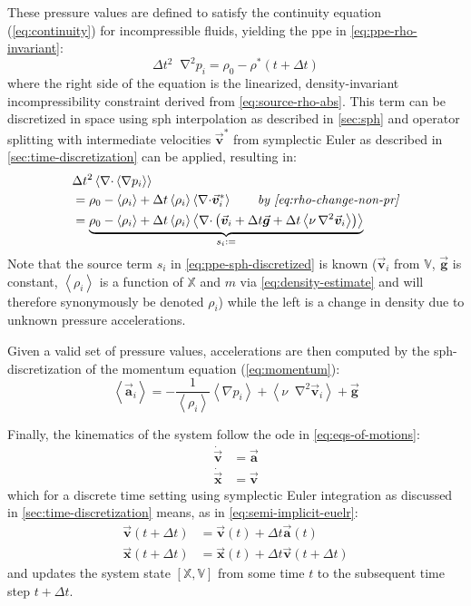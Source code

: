 \documentclass[conference]{IEEEtran}
\newcommand*\Laplace{\mathop{}\!\mathbin\nabla^2}
\newcommand\vek[1]{\vec{\bm{#1}}}
\newcommand\mat[1]{{\mathds{#1}}}
\newcommand\br[1]{\left(#1\right)}
\newcommand\abr[1]{\left\langle#1\right\rangle}
\newcommand\divergence{{\nabla\cdot}}
\begin{document}
These pressure values are defined to satisfy the continuity equation (\autoref{eq:continuity}) for incompressible fluids, yielding the \acf{ppe} in \autoref{eq:ppe-rho-invariant}:
\begin{equation}
  \Delta t^2 \Laplace p_i = \rho_0 - \rho^*(t+\Delta t)
\end{equation}
where the right side of the equation is the linearized, density-invariant incompressibility constraint derived from \autoref{eq:source-rho-abs}. This term can be discretized in space using \ac{sph} interpolation as described in \autoref{sec:sph} and operator splitting with intermediate velocities $\vek{v}^*$ from symplectic Euler as described in \autoref{sec:time-discretization} can be applied, resulting in:
\begin{align}
  &\Delta t^2 \abr{\divergence \abr{\nabla p_i}} \\
  &= \rho_0 - \abr{\rho_i} + \Delta t \abr{\rho_i}\abr{\divergence \vek{v}^*_i}\qquad\textit{by \autoref{eq:rho-change-non-pr}}\\
  &= \underbrace{\rho_0 - \abr{\rho_i} + \Delta t \abr{\rho_i}\abr{\divergence \br{\vek{v}_i + \Delta t \vek{g} + \Delta t \abr{\nu\Laplace\vek{v}_i}}}}_{s_i :=}  %
  \label{eq:ppe-sph-discretized}
\end{align}
Note that the source term $s_i$ in \autoref{eq:ppe-sph-discretized} is known ($\vek{v}_i$ from $\mat{V}$, $\vek{g}$ is constant, $\abr{\rho_i}$ is a function of $\mat{X}$ and $m$ via \autoref{eq:density-estimate} and will therefore synonymously be denoted $\rho_i$) while the left is a change in density due to unknown pressure accelerations.

Given a valid set of pressure values, accelerations are then computed by the \ac{sph}-discretization of the momentum equation (\autoref{eq:momentum}):
\begin{equation}\label{eq:discretized-momentum}
  \abr{\vek{a}_i }= -\frac{1}{\abr{\rho_i}}\abr{\nabla p_i} + \abr{ \nu \Laplace \vek{v}_i} + \vek{g}
\end{equation}

Finally, the kinematics of the system follow the \acs{ode} in \autoref{eq:eqs-of-motions}:
\begin{align}
  \dot{\vek{v}} &= \vek{a}\\
  \dot{\vek{x}} &= \vek{v}
\end{align}
which for a discrete time setting using symplectic Euler integration as discussed in \autoref{sec:time-discretization} means, as in \autoref{eq:semi-implicit-euelr}:
\begin{align}
  \vek{v}\br{t + \Delta t} &= \vek{v}(t) + \Delta t \vek{a}(t)\\
  \vek{x}\br{t + \Delta t} &= \vek{x}(t) + \Delta t \vek{v}\br{t + \Delta t}
\end{align}
and updates the system state $[\mat{X}, \mat{V}]$ from some time $t$ to the subsequent time step $t+\Delta t$. 
\end{document}
